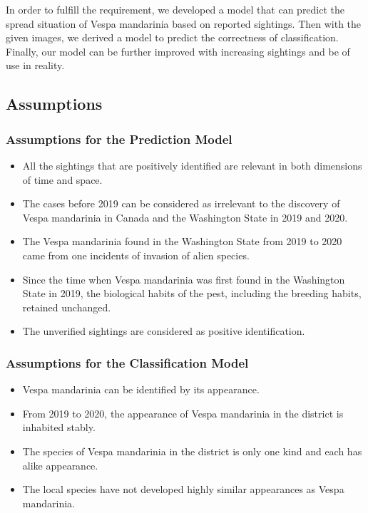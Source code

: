 \documentclass{mcmthesis}
\begin{document}
In order to fulfill the requirement, we developed a model that can predict the spread situation of Vespa mandarinia based on reported sightings. Then with the given images, we derived a model to predict the correctness of classification. Finally, our model can be further improved with increasing sightings and be of use in reality.



\subsection{Assumptions}
\subsubsection{Assumptions for the Prediction Model}
\begin{itemize}
    \item All the sightings that are positively identified are relevant in both dimensions of time and space.
    \item The cases before 2019 can be considered as irrelevant to the discovery of Vespa mandarinia in Canada and the Washington State in 2019 and 2020.
    \item The Vespa mandarinia found in the Washington State from 2019 to 2020 came from one incidents of invasion of alien species.
    \item Since the time when Vespa mandarinia was first found in the Washington State in 2019, the biological habits of the pest, including the breeding habits, retained unchanged.
    \item The unverified sightings are considered as positive identification.
\end{itemize}

\subsubsection{Assumptions for the Classification Model}
\begin{itemize}
    \item Vespa mandarinia can be identified by its appearance.
    \item From 2019 to 2020, the appearance of Vespa mandarinia in the district is inhabited stably.
    \item The species of Vespa mandarinia in the district is only one kind and each has alike appearance.
    \item The local species have not developed highly similar appearances as Vespa mandarinia. 
\end{itemize}
\end{document}
